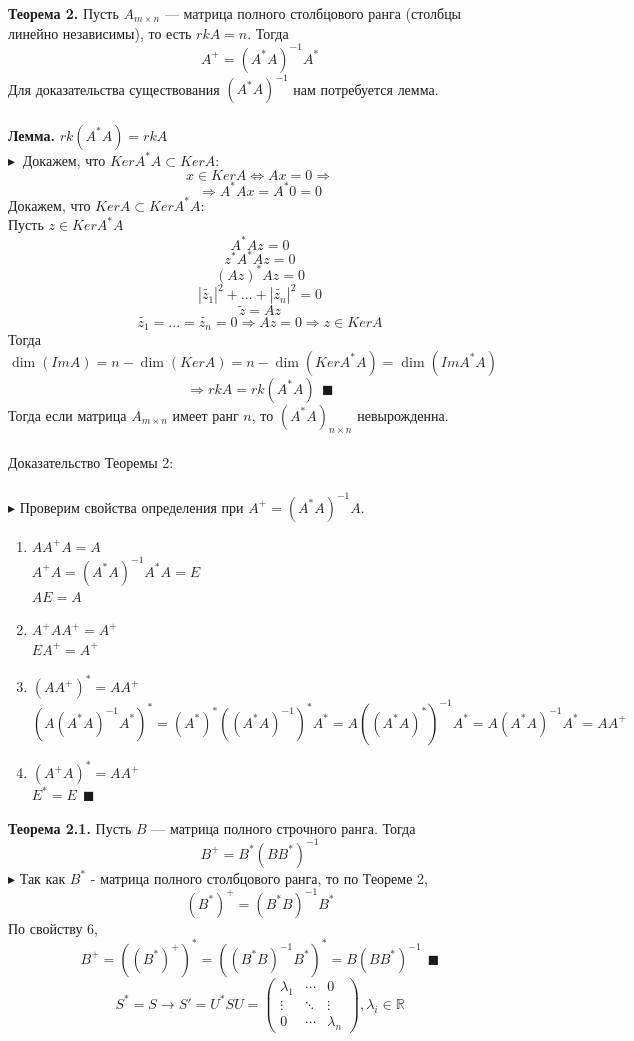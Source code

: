 \documentclass[12pt]{article}
\theoremstyle{definition}
\numberwithin{equation}{section}
\begin{document}
%
%
\textbf{Теорема 2.}
Пусть $A_{m \times n}$ --- матрица полного столбцового ранга (столбцы линейно независимы), то есть $rkA=n$. Тогда $$A^+=(A^*A)^{-1}A^*$$
Для доказательства существования $(A^*A)^{-1}$ нам потребуется лемма.\\\\
%
%
\textbf{Лемма.}
$rk(A^*A)=rkA$\\
$\blacktriangleright ~$ 
Докажем, что $Ker A^*A\subset Ker A$:
$$x\in Ker A \Leftrightarrow Ax=0\Rightarrow$$
$$\Rightarrow A^*Ax=A^* {0}=0$$
Докажем, что $Ker A\subset Ker A^*A$:\\
Пусть $z\in Ker A^*A$\\
$$A^*Az=0$$
$$z^*A^*Az=0$$
$$(Az)^*Az=0$$
$$|\tilde{z_1}|^2+...+|\tilde{z_n}|^2=0$$
$$\tilde{z}=Az$$
$$\tilde{z_1}=...=\tilde{z_n}=0 \Rightarrow Az=0 \Rightarrow z\in Ker A$$
Тогда $\dim(Im A)= n - \dim(Ker A) = n - \dim(Ker A^*A) =\dim(Im A^*A)$\\
$$\Rightarrow rk A = rk (A^*A) ~~ \blacksquare$$
%
%
Тогда если матрица $A_{m\times n}$ имеет ранг $n$, то $(A^*A)_{n\times n}$ невырожденна.\\\\
%
%
Доказательство Теоремы 2:\\\\
$\blacktriangleright$ Проверим свойства определения при $A^+=(A^*A)^{-1}A$.
\begin{enumerate}
\item $AA^+A=A$\\
$A^+A=(A^*A)^{-1}A^*A=E$\\
$AE=A$
\item $A^+AA^+=A^+$\\
$EA^+=A^+$
\item $(AA^+)^*=AA^+$\\
$(A(A^*A)^{-1}A^*)^*=(A^*)^*((A^*A)^{-1})^*A^*=A((A^*A)^*)^{-1}A^*=A(A^*A)^{-1}A^*=AA^+$
\item $(A^+A)^*=AA^+$\\
$E^*=E ~~\blacksquare$\\
\end{enumerate}
%
%
\textbf{Теорема 2.1.}
Пусть $B$ --- матрица полного строчного ранга. Тогда $$B^+=B^*(BB^*)^{-1}$$
$\blacktriangleright$ 
Так как $B^*$ - матрица полного столбцового ранга, то по Теореме 2,\\
$$(B^*)^+=(B^*B)^{-1}B^*$$
По свойству 6,
$$B^+=((B^*)^+)^*=((B^*B)^{-1}B^*)^*=B(BB^*)^{-1} ~~ \blacksquare$$
%
%
\newpage
\[S^*=S \to S'=U^*SU = \begin{pmatrix}
\lambda_1 & \cdots & 0 \\         
\vdots & \ddots & \vdots \\
0 & \cdots & \lambda_n
\end{pmatrix}, \lambda_i \in \mathbb{R}\]
\end{document}
